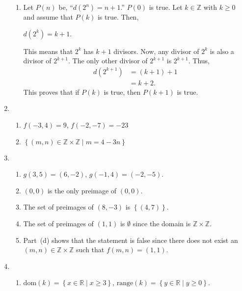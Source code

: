 \begin{enumerate}
\begin{enumerate}
\item Let $P \left( n \right)$ be, ``$d \left( 2^n \right) = n + 1$.''  $P \left( 0 \right)$ is true.  Let $k \in \mathbb{Z}$ with $k \geq 0$ and assume that $P \left( k \right)$ is true.  Then,
\begin {center}
$d \left( 2^k \right) = k + 1$.
\end{center}
This means that $2^k$ has $k + 1$ divisors.  Now, any divisor of $2^k$ is also a divisor of 
$2^{k+1}$.  The only other divisor of $2^{k+1}$ is $2^{k+1}$.  Thus,
\[
\begin{aligned}
d \left( 2^{k + 1} \right)&= ( k + 1 ) + 1 \\
                      &= k + 2.
\end{aligned}
\]
This proves that if $P( k )$ is true, then $P( k + 1 )$ is true.
\end{enumerate}




\item \begin{enumerate}
\item $f( { - 3, 4} ) = 9$, $f( { - 2, - 7} ) =  - 23$

\item $\left\{ { {( {m, n} ) \in \mathbb{Z} \times \mathbb{Z} } \mid m = 4 - 3n} \right\}$
\end{enumerate}




\item \begin{enumerate}
\item $g ( 3, 5 ) = ( 6, -2 )$, \qquad
$g ( -1, 4 ) = ( -2, -5 )$.

\item $( 0, 0 )$ is the only preimage of $( 0, 0 )$.

\item The set of  preimages of $( 8, -3 )$ is $\left\{ ( 4, 7 ) \right\}$. 

\item The set of  preimages of $( 1, 1 )$ is $\emptyset$ since the domain is $\mathbb{Z} \times \mathbb{Z}$. 

\item Part~(d) shows that the statement is false since there does not exist an 
$( m, n ) \in \mathbb{Z} \times \mathbb{Z}$ such that 
$f ( m, n ) = ( 1, 1 )$.
\end{enumerate}

\item \begin{enumerate}
\item $\text{dom}( k ) = \left\{ {x \in \mathbb{R}  \mid x \geq 3} \right\}$,  
$\text{range} ( k ) = \left\{ y \in \mathbb{R} \mid y \geq 0 \right\}$.


\end{enumerate}
\end{enumerate}
